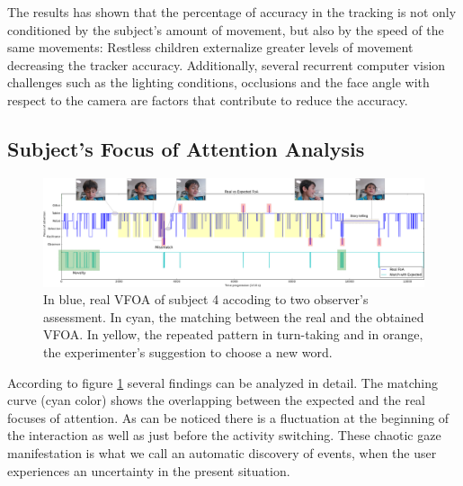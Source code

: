 \documentclass{sig-alternate}
\begin{document}
The results has shown that the percentage of accuracy in the tracking is not only conditioned by the subject's amount of movement, but also by the speed of the same movements: Restless children externalize greater levels of movement decreasing the tracker accuracy. Additionally, several recurrent computer vision challenges such as the lighting conditions, occlusions and the face angle with respect to the camera are factors that contribute to reduce the accuracy.

\subsection{Subject's Focus of Attention Analysis}

\begin{figure}
    \centering
    \includegraphics[width=1.8\columnwidth]{realExpected}
    \caption{\small In blue, real VFOA of subject 4 accoding to two observer's assessment. In cyan, the matching between the real and the obtained VFOA. In yellow, the repeated pattern in turn-taking and in orange, the experimenter's suggestion to choose a new word.}
    \label{fig:realExpected}
    
\end{figure}

According to figure \ref{fig:realExpected} several findings can be analyzed in detail. The matching curve (cyan color) shows the overlapping between the expected and the real focuses of attention. As can be noticed there is a fluctuation at the beginning of the interaction as well as just before the activity switching. These chaotic gaze manifestation is what we call an automatic discovery of events, when the user experiences an uncertainty in the present situation. 
\end{document}
